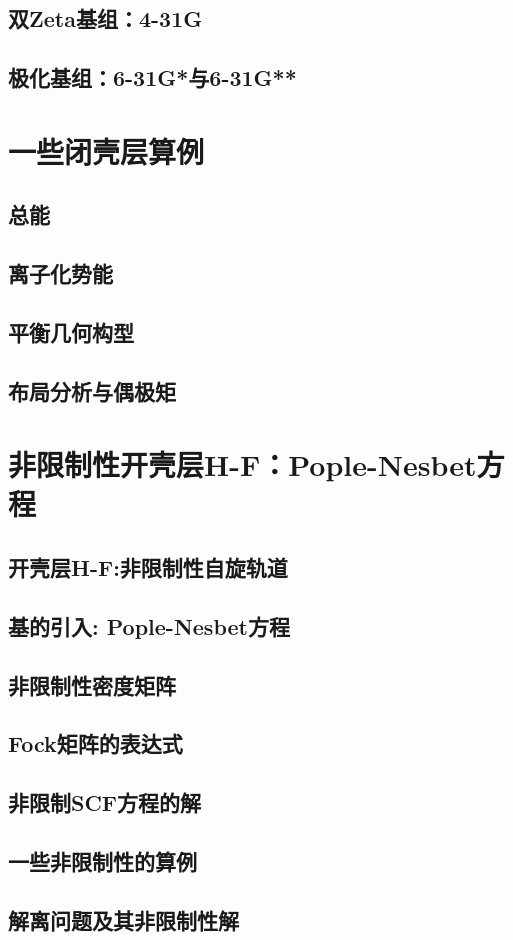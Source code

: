 \subsection{双Zeta基组：4-31G}
\subsection{极化基组：6-31G*与6-31G**}
\section{一些闭壳层算例}
\subsection{总能}
\subsection{离子化势能}
\subsection{平衡几何构型}
\subsection{布局分析与偶极矩}

\section{非限制性开壳层H-F：Pople-Nesbet方程}
\subsection{开壳层H-F:非限制性自旋轨道}
\subsection{基的引入: Pople-Nesbet方程}
\subsection{非限制性密度矩阵}
\subsection{Fock矩阵的表达式}
\subsection{非限制SCF方程的解}
\subsection{一些非限制性的算例}
\subsection{解离问题及其非限制性解}

\theendnotes

